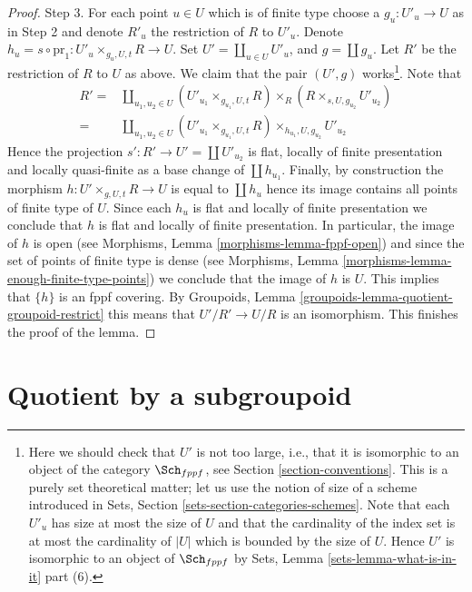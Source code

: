 \begin{proof}
\medskip\noindent
Step 3. For each point $u \in U$ which is of finite type
choose a $g_u : U'_u \to U$ as in
Step 2 and denote $R'_u$ the restriction of $R$ to $U'_u$.
Denote $h_u = s \circ \text{pr}_1 : U'_u \times_{g_u, U, t} R \to U$. Set
$U' = \coprod_{u \in U} U'_u$, and $g = \coprod g_u$. Let $R'$ be the
restriction of $R$ to $U$ as above. We claim that
the pair $(U', g)$ works\footnote{Here we should check that $U'$ is not
too large, i.e., that it is isomorphic to an object of the category
$\Sch_{fppf}$, see
Section \ref{section-conventions}.
This is a purely set theoretical matter; let us use the notion of size of
a scheme introduced in
Sets, Section \ref{sets-section-categories-schemes}.
Note that each $U'_u$ has size at most the size of $U$
and that the cardinality of the index set is at most the cardinality of
$|U|$ which is bounded by the size of $U$. Hence $U'$ is isomorphic
to an object of $\Sch_{fppf}$ by
Sets, Lemma \ref{sets-lemma-what-is-in-it} part (6).}.
Note that
\begin{align*}
R' = &
\coprod\nolimits_{u_1, u_2 \in U}
(U'_{u_1} \times_{g_{u_1}, U, t} R)
\times_R
(R \times_{s, U, g_{u_2}} U'_{u_2}) \\
= &
\coprod\nolimits_{u_1, u_2 \in U}
(U'_{u_1} \times_{g_{u_1}, U, t} R) \times_{h_{u_1}, U, g_{u_2}} U'_{u_2}
\end{align*}
Hence the projection $s' : R' \to U' = \coprod U'_{u_2}$
is flat, locally of finite
presentation and locally quasi-finite as a base change of $\coprod h_{u_1}$.
Finally, by construction the morphism
$h : U' \times_{g, U, t} R \to U$ is equal to $\coprod h_u$ hence
its image contains all points of finite type of $U$.
Since each $h_u$ is flat and locally of finite presentation we conclude that
$h$ is flat and locally of finite presentation.
In particular, the image of $h$ is open (see
Morphisms, Lemma \ref{morphisms-lemma-fppf-open})
and since the set of points of finite type is dense (see
Morphisms, Lemma \ref{morphisms-lemma-enough-finite-type-points})
we conclude that the image of $h$ is $U$. This implies that
$\{h\}$ is an fppf covering. By
Groupoids, Lemma \ref{groupoids-lemma-quotient-groupoid-restrict}
this means that $U'/R' \to U/R$ is an isomorphism.
This finishes the proof of the lemma.
\end{proof}










\section{Quotient by a subgroupoid}
\label{section-dividing}

